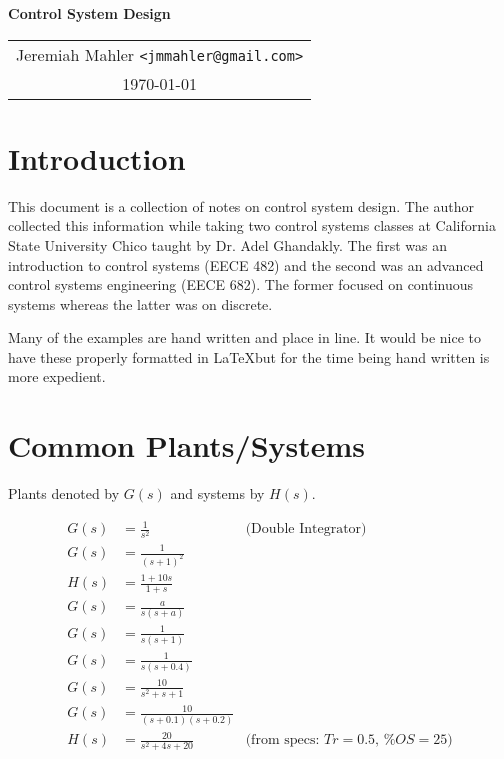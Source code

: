 \documentclass{article}
\begin{document}

\vspace*{0.5in}

\centerline{\LARGE \textbf{Control System Design}}
\vspace{0.2in}

\begin{center}
\begin{tabular}{c}
Jeremiah Mahler \texttt{<jmmahler@gmail.com>} \\
\today
\end{tabular}
\end{center}

\thispagestyle{empty}
\vfill
\pagebreak


\tableofcontents

\clearpage

\section{Introduction}

This document is a collection of notes on control system design.
The author collected this information while taking two control systems
classes at California State University Chico taught by Dr. Adel Ghandakly.
The first was an introduction to control systems (EECE 482) and
the second was an advanced control systems engineering (EECE 682).
The former focused on continuous systems whereas the latter was on
discrete.

Many of the examples are hand written and place in line.
It would be nice to have these properly formatted in \LaTeX but
for the time being hand written is more expedient.

\section{Common Plants/Systems}

\nocite{ogata1995discrete}
\nocite{franklin1998digital}

Plants denoted by $G(s)$ and systems by $H(s)$.

\begin{align*}
	G(s) &= \frac{1}{s^2} & \mbox{(Double Integrator)}\\
	G(s) &= \frac{1}{(s + 1)^2} \\
	H(s) &= \frac{1 + 10s}{1 + s} \\
	G(s) &= \frac{a}{s(s + a)} \\
	G(s) &= \frac{1}{s(s + 1)} \\
	G(s) &= \frac{1}{s(s + 0.4)} \\
	G(s) &= \frac{10}{s^2 + s + 1} \\
	G(s) &= \frac{10}{(s + 0.1)(s + 0.2)} \\
	H(s) &= \frac{20}{s^2 + 4s + 20} & \mbox{(from specs: $Tr = 0.5$, $\%OS = 25$)}
\end{align*}
\end{document}
